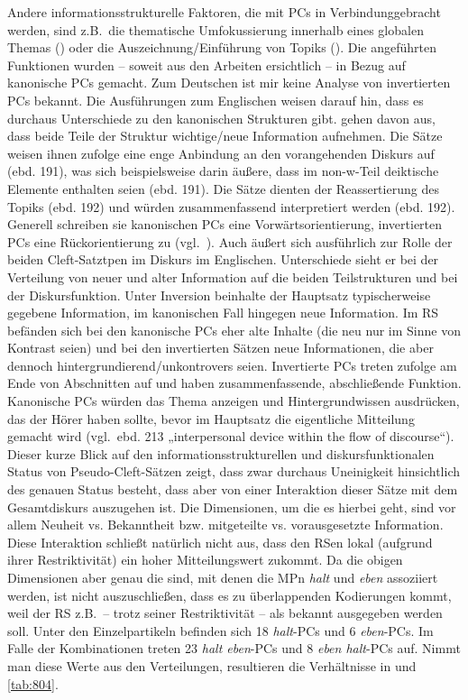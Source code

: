 Andere informationsstrukturelle Faktoren, die mit PCs in Verbindung\linebreak gebracht werden, sind z.B.\ die thematische Umfokussierung innerhalb eines globalen Themas (\citealt[75]{Guenthner2006}) oder die Auszeichnung/Einführung von Topiks (\citealt[186, 196]{Weinert1996}). Die angeführten Funktionen wurden – soweit aus den Arbeiten ersichtlich – in Bezug auf kanonische PCs gemacht. Zum Deutschen ist mir keine Analyse von invertierten PCs bekannt. Die Ausführungen zum Eng\-lischen weisen darauf hin, dass es durchaus Unterschiede zu den kanoni\-schen Strukturen gibt. \citet[190]{Weinert1996} gehen davon aus, dass beide Teile der Struktur wichtige/neue Information aufnehmen. Die Sätze weisen ihnen zufolge eine enge Anbindung an den vorangehenden Diskurs auf (ebd. 191), was sich beispielsweise darin äußere, dass im non-w-Teil deiktische Elemente enthalten seien (ebd. 191). Die Sätze dienten der Reassertierung des Topiks (ebd. 192) und würden zusammenfassend interpretiert werden (ebd. 192). Generell schreiben sie kanoni\-schen PCs eine Vorwärtsorientierung, invertierten PCs eine Rückorientierung zu (vgl.\ \citealt[199]{Weinert1996}). Auch \citet[120, 145, Kapitel 6.1, 6.2]{Collins1991} äußert sich ausführlich zur Rolle der beiden Cleft-Satztpen im Diskurs im Eng\-lischen. Unterschiede sieht er bei der Verteilung von neuer und alter Information auf die beiden Teilstrukturen und bei der Diskursfunktion. Unter Inversion beinhalte der Hauptsatz typischerweise gegebene Information, im kanonischen Fall hingegen neue Information. Im RS befänden sich bei den kanonische PCs eher alte Inhalte (die neu nur im Sinne von Kontrast seien) und bei den invertierten Sätzen neue Informationen, die aber dennoch hintergrundierend/unkontrovers seien. Invertierte PCs treten \citet{Collins1991} zufolge am Ende von Abschnitten auf und haben zusammenfassende, abschließende Funktion. Kanonische PCs würden das Thema anzeigen und Hintergrundwissen ausdrücken, das der Hörer haben sollte, bevor im Hauptsatz die eigentliche Mitteilung gemacht wird (vgl.\ ebd. 213 „interpersonal  device within the flow of discourse“). Dieser kurze Blick auf den informationsstrukturellen und diskursfunktionalen Status von Pseudo-Cleft-Sätzen zeigt, dass zwar durchaus Uneinigkeit hinsichtlich des genauen Status besteht, dass aber von einer Interaktion dieser Sätze mit dem Gesamtdiskurs auszugehen ist. Die Dimensionen, um die es hierbei geht, sind vor allem Neuheit vs. Bekanntheit bzw. mitgeteilte vs. vorausgesetzte Information. Diese Interaktion schließt natürlich nicht aus, dass den RSen lokal (aufgrund ihrer Restriktivität) ein hoher Mitteilungswert zukommt. Da die obigen Dimensionen aber genau die sind, mit denen die MPn \textit{halt} und \textit{eben} assoziiert werden, ist nicht auszuschließen, dass es zu überlappenden Kodierungen kommt, weil der RS z.B.\ – trotz seiner Restriktivität – als bekannt ausgegeben werden soll. Unter den Einzelpartikeln befinden sich 18 \textit{halt}-PCs und 6 \textit{eben}-PCs. Im Falle der Kombinationen treten 23 \textit{halt eben}-PCs und 8 \textit{eben halt}-PCs auf. Nimmt man diese Werte aus den Verteilungen, resultieren die Verhältnisse in  und \ref{tab:804}.

